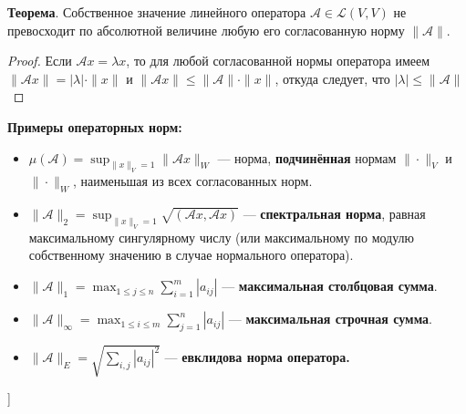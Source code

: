 \textbf{Теорема}. Собственное значение линейного оператора $\mathcal{A}\in\mathcal{L}(V,V)$ не превосходит по абсолютной величине любую его согласованную норму $\|\mathcal{A}\|$.

\begin{proof}
Если $\mathcal{A}x=\lambda x$, то для любой согласованной нормы оператора имеем $\| \mathcal{A}x \| = |\lambda| \cdot \| x \|$ и $\| \mathcal{A}x \| \leqslant \| \mathcal{A} \| \cdot \| x \|$, откуда следует, что $|\lambda| \leqslant \| \mathcal{A} \|$
\end{proof}

\textbf{Примеры операторных норм:}
\begin{itemize}
    \item $\mu(\mathcal{A}) = \displaystyle\sup_{\|x\|_V=1}\|\mathcal{A}x\|_W$ --- норма, \textbf{подчинённая} нормам $\| \cdot \|_V$ и $\| \cdot \|_W$, наименьшая из всех согласованных норм.
    \item $\|\mathcal{A}\|_2 = \displaystyle\sup_{\|x\|_V=1} \sqrt{(\mathcal{A}x,\mathcal{A}x)}$ --- \textbf{спектральная норма}, равная максимальному сингулярному числу (или максимальному по модулю собственному значению в случае нормального оператора).
    \item $\|\mathcal{A}\|_1 = \displaystyle\max_{1\leqslant j\leqslant n} \displaystyle\sum_{i=1}^{m}|a_{ij}|$ --- \textbf{максимальная столбцовая сумма}.
    \item $\|\mathcal{A}\|_{\infty} = \displaystyle\max_{1\leqslant i\leqslant m} \displaystyle\sum_{j=1}^{n}|a_{ij}|$ --- \textbf{максимальная строчная сумма}.
    \item $\|\mathcal{A}\|_E = \sqrt{\displaystyle\sum_{i,j}|a_{ij}|^2}$ --- \textbf{евклидова норма оператора.}
\end{itemize}




\bigbreak
[\cite[page 240-241, 352-353]{kim}]